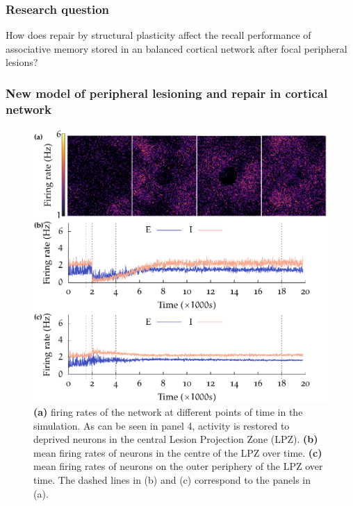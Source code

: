 \begin{frame}
  \titlepage{}
\end{frame}

\begin{frame}[c]
  \frametitle{Research question}
  How does repair by structural plasticity affect the recall performance of associative memory stored in an balanced cortical network after focal peripheral lesions?
\end{frame}
\begin{frame}[c]
  \frametitle{New model of peripheral lesioning and repair in cortical network}
  \begin{figure}[h]
    \centering
    \includegraphics[width=0.5\linewidth]{99_images/deaff-repair}
    \caption{\textbf{(a)} firing rates of the network at different points of time in the simulation. As can be seen in panel 4, activity is restored to deprived neurons in the central Lesion Projection Zone (LPZ).
      \textbf{(b)} mean firing rates of neurons in the centre of the LPZ over time.
      \textbf{(c)} mean firing rates of neurons on the outer periphery of the LPZ over time. 
      The dashed lines in (b) and (c) correspond to the panels in (a).}
  \end{figure}
\end{frame}
